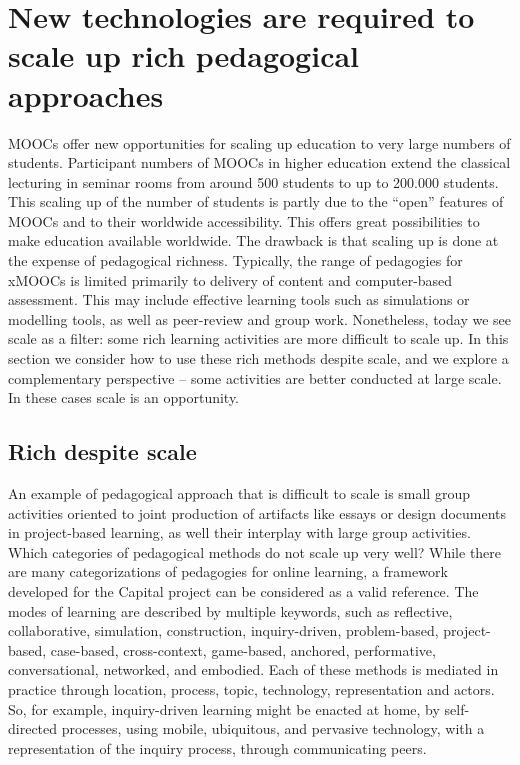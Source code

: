\section{New technologies are required to scale up rich pedagogical approaches}


MOOCs offer new opportunities for scaling up education to very large
numbers of students. Participant numbers of MOOCs in higher education
extend the classical lecturing in seminar rooms from around 500 students
to up to 200.000 students. This scaling up of the number of students is
partly due to the “open” features of MOOCs and to their worldwide
accessibility. This offers great possibilities to make education
available worldwide.  The drawback is that scaling up is done at the
expense of pedagogical richness. Typically, the range of pedagogies for
xMOOCs is limited primarily to delivery of content and computer-based
assessment. This may include effective learning tools such as
simulations or modelling tools, as well as peer-review and group
work. Nonetheless, today we see scale as a filter: some rich learning
activities are more difficult to scale up. In this section we consider
how to use these rich methods despite scale, and we explore a
complementary perspective -- some activities are better conducted at
large scale. In these cases scale is an opportunity.  

\subsection{Rich despite scale}

An example of pedagogical approach that is difficult to scale is small
group activities oriented to joint production of artifacts like essays
or design documents in project-based learning, as well their interplay
with large group activities. Which categories of pedagogical methods do
not scale up very well? While there are many categorizations of
pedagogies for online learning, a framework developed for the Capital
project can be considered as a valid reference. The modes of learning
are described by multiple keywords, such as reflective, collaborative,
simulation, construction, inquiry-driven, problem-based, project-based,
case-based, cross-context, game-based, anchored, performative,
conversational, networked, and embodied. Each of these methods is
mediated in practice through location, process, topic, technology,
representation and actors. So, for example, inquiry-driven learning
might be enacted at home, by self-directed processes, using mobile,
ubiquitous, and pervasive technology, with a representation of the
inquiry process, through communicating peers.


